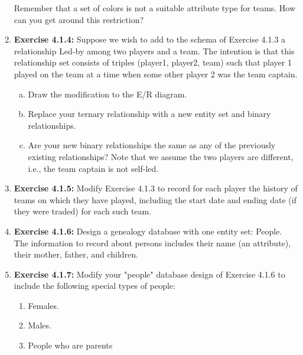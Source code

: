 \documentclass[12pt]{article}
\begin{document}
\begin{enumerate}[1.]
    \bigskip

    Remember that a set of colors is not a suitable attribute type for teams. How can you get around this restriction?

    \item \textbf{Exercise 4.1.4:} Suppose we wish to add to the schema of Exercise 4.1.3 a
    relationship Led-by among two players and a team. The intention is that this
    relationship set consists of triples (player1, player2, team) such that player 1
    played on the team at a time when some other player 2 was the team captain.

    \bigskip

    \begin{enumerate}[a)]
        \item Draw the modification to the E/R diagram.
        \item Replace your ternary relationship with a new entity set and binary relationships.
        \item Are your new binary relationships the same as any of the previously existing relationships? Note that we assume the two players are different, i.e., the team captain is not self-led.
    \end{enumerate}

    \item \textbf{Exercise 4.1.5:} Modify Exercise 4.1.3 to record for each player the history of
    teams on which they have played, including the start date and ending date (if
    they were traded) for each such team.

    \item \textbf{Exercise 4.1.6:} Design a genealogy database with one entity set: People. The
    information to record about persons includes their name (an attribute), their
    mother, father, and children.

    \item \textbf{Exercise 4.1.7:} Modify your "people" database design of Exercise 4.1.6 to
    include the following special types of people:

    \bigskip

    \begin{enumerate}[1.]
        \item Females.
        \item Males.
        \item People who are parents
    \end{enumerate}

    \bigskip


\end{enumerate}
\end{document}
